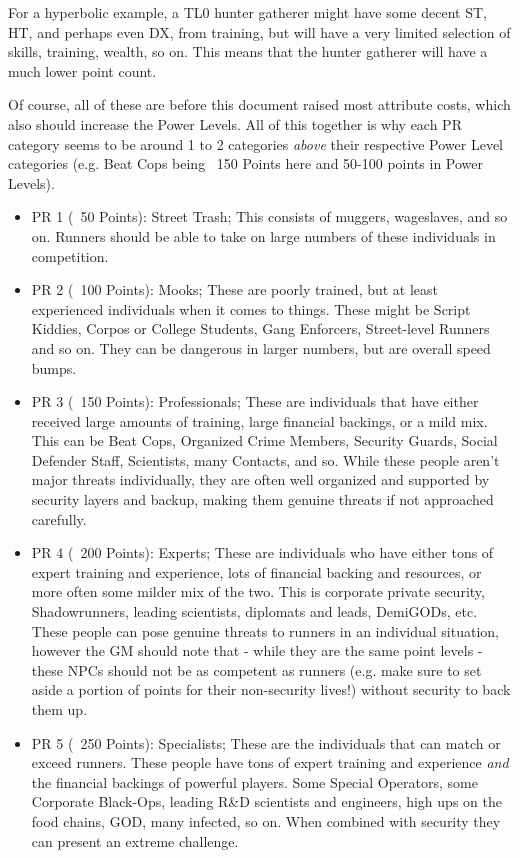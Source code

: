 \begin{multicols*}{2}
	For a hyperbolic example, a TL0 hunter gatherer might have some decent ST, HT, and perhaps even DX, from training, but will have a very limited selection of skills, training, wealth, so on. This means that the hunter gatherer will have a much lower point count.	
	 
	 Of course, all of these are before this document raised most attribute costs, which also should increase the Power Levels. All of this together is why each PR category seems to be around 1 to 2 categories \textit{above} their respective Power Level categories (e.g. Beat Cops being ~150 Points here and 50-100 points in Power Levels).
	
	\begin{itemize}
		\item PR 1 (~50 Points): Street Trash; This consists of muggers, wageslaves, and so on. Runners should be able to take on large numbers of these individuals in competition.
		\item PR 2 (~100 Points): Mooks; These are poorly trained, but at least experienced individuals when it comes to things. These might be Script Kiddies, Corpos or College Students, Gang Enforcers, Street-level Runners and so on. They can be dangerous in larger numbers, but are overall speed bumps.
		\item PR 3 (~150 Points): Professionals; These are individuals that have either received large amounts of training, large financial backings, or a mild mix. This can be Beat Cops, Organized Crime Members, Security Guards, Social Defender Staff, Scientists, many Contacts, and so. While these people aren't major threats individually, they are often well organized and supported by security layers and backup, making them genuine threats if not approached carefully.
		\item PR 4 (~200 Points): Experts; These are individuals who have either tons of expert training and experience, lots of financial backing and resources, or more often some milder mix of the two. This is corporate private security, Shadowrunners, leading scientists, diplomats and leads, DemiGODs, etc. These people can pose genuine threats to runners in an individual situation, however the GM should note that - while they are the same point levels - these NPCs should not be as competent as runners (e.g. make sure to set aside a portion of points for their non-security lives!) without security to back them up.
		\item PR 5 (~250 Points): Specialists; These are the individuals that can match or exceed runners. These people have tons of expert training and experience \textit{and} the financial backings of powerful players. Some Special Operators, some Corporate Black-Ops, leading R\&D scientists and engineers, high ups on the food chains, GOD, many infected, so on. When combined with security they can present an extreme challenge.

\end{itemize}
\end{multicols*}
